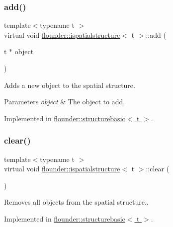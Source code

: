\subsubsection{\texorpdfstring{add()}{add()}}
{\footnotesize\ttfamily template$<$typename t $>$ \\
virtual void \hyperlink{classflounder_1_1ispatialstructure}{flounder\+::ispatialstructure}$<$ t $>$\+::add (\begin{DoxyParamCaption}\item[{t $\ast$}]{object }\end{DoxyParamCaption})\hspace{0.3cm}{\ttfamily [pure virtual]}}



Adds a new object to the spatial structure. 


\begin{DoxyParams}{Parameters}
{\em object} & The object to add. \\
\hline
\end{DoxyParams}


Implemented in \hyperlink{classflounder_1_1structurebasic_a4e3549d986f547a8789d38cf8a820f18}{flounder\+::structurebasic$<$ t $>$}.

\mbox{\label{classflounder_1_1ispatialstructure_a422fac0231ea3095e2f85951259a4686}} 
\subsubsection{\texorpdfstring{clear()}{clear()}}
{\footnotesize\ttfamily template$<$typename t $>$ \\
virtual void \hyperlink{classflounder_1_1ispatialstructure}{flounder\+::ispatialstructure}$<$ t $>$\+::clear (\begin{DoxyParamCaption}{ }\end{DoxyParamCaption})\hspace{0.3cm}{\ttfamily [pure virtual]}}



Removes all objects from the spatial structure.. 



Implemented in \hyperlink{classflounder_1_1structurebasic_a080579359485a5b32489a004c70da095}{flounder\+::structurebasic$<$ t $>$}.

